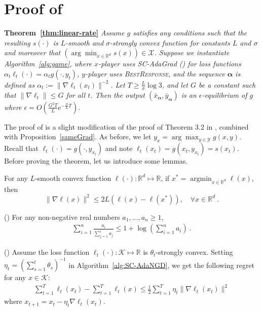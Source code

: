 \documentclass[pmlr]{jmlr} %
\def\reals{\mathbb{R}}
\def\reals{\mathbb{R}}
\def\K{\mathcal{K}}
\def\argmin{\mathop{\arg\min}}
\def\balpha{\boldsymbol{\alpha}}
\def\BR{\textsc{BestResponse}\xspace}
\newcommand{\yx}[1]{y_{#1}}
\newcommand{\XX}{\mathcal{X}}
\newcommand{\YY}{\mathcal{Y}}
\newcommand{\pr}[1]{\left(#1\right)}
\begin{document}
\section{Proof of } \label{app:linear-rate}

\textbf{Theorem~\ref{thm:linear-rate}}
\textit{ 
Assume $g$ satisfies any conditions such that the resulting $s(\cdot)$ is $L$-smooth and $\sigma$-strongly convex function for constants $L$ and $\sigma$ and moreover that $(\arg\min_{x\in \reals^d} s(x)) \in \XX$. Suppose we instantiate Algorithm~\ref{alg:game}, where $x$-player uses SC-AdaGrad () for loss functions $\alpha_{t} \ell_{t}(\cdot) = \alpha_{t} g(\cdot, y_{t})$, $y$-player uses \BR, and the sequence $\balpha$ is defined as $\alpha_{t} := \| \nabla \ell_{t}(x_{t}) \|^{-2}$. Let $T \geq \frac L \sigma \log 3$, and let $G$ be a constant such that $\|\nabla \ell_{t}\| \le G$ for all $t$. Then the output $(\bar x_{\balpha}, \bar y_{\balpha})$ is an $\epsilon$-equilibrium of $g$ where $\epsilon = O\pr{\frac{G^{2} T}{L}e^{-\frac{\sigma}{L}T}}$.
}


The proof of  is a slight modification of the proof of Theorem 3.2 in \cite{L17}, combined with Proposition~\ref{sameGrad}. As before, we let $\yx{x} = \arg\max_{y\in \YY} g(x,y)$. Recall that $\ell_{t}(\cdot) = g(\cdot, \yx{x_{t}})$ and note $\ell_{t}(x_{t}) = g(x_{t},\yx{x_{t}}) = s(x_{t})$.
Before proving the theorem, let us introduce some lemmas.

\begin{lemma} \label{lem:GSmooth}
For any $L$-smooth convex function $\ell(\cdot):\reals^{d} \mapsto \reals$, if $x^{*} =\argmin_{x\in \reals^d} \ell(x)$, then 
\[ \| \nabla \ell(x)\|^{2} \le 2 L \left( \ell(x) - \ell(x^{*})\right), \quad \forall x\in \reals^{d}~.\]
\end{lemma} 

\begin{lemma} (\cite{L17}) \label{lem:Log_{s}um} 
For any non-negative real numbers $a_{1},\ldots, a_{n}\geq 1$,
\begin{align*}
\sum_{i=1}^{n} \frac{a_{i}}{\sum_{j=1}^{i} a_{j}} 
\le 
1+\log\left( \sum_{i=1}^{n} a_{i}\right) ~.
\end{align*}
\end{lemma}

\begin{lemma} (\cite{hazan2007logarithmic,L17}) \label{osc}
Assume the loss function $\ell_{t}(\cdot): \K\mapsto \reals$ is $\theta_{t}$-strongly convex. Setting $\eta_{t} = \pr{\sum_{s=1}^{t} \theta_{s}}^{{-1}}$ in Algorithm~\ref{alg:SC-AdaNGD}, we get the following regret for any $x \in \K$:
  \begin{align}
  \sum_{t=1}^{T} \ell_{t}(x_{t}) - \sum_{t=1}^{T} \ell_{t}(x) \le \frac{1}{2}\sum_{t=1}^{T} \eta_{t} \| \nabla \ell_{t}(x_{t}) \|^{2}
  \end{align}
  where $x_{t+1} = x_{t} - \eta_{t}  \nabla \ell_{t}(x_{t})$.
\end{lemma}
\end{document}
